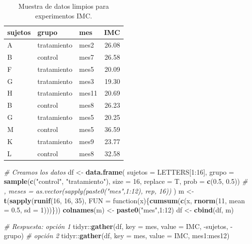 \documentclass[]{article}
\newenvironment{Shaded}{\begin{snugshade}}{\end{snugshade}}
\newcommand{\KeywordTok}[1]{\textcolor[rgb]{0.13,0.29,0.53}{\textbf{{#1}}}}
\newcommand{\DataTypeTok}[1]{\textcolor[rgb]{0.13,0.29,0.53}{{#1}}}
\newcommand{\DecValTok}[1]{\textcolor[rgb]{0.00,0.00,0.81}{{#1}}}
\newcommand{\FloatTok}[1]{\textcolor[rgb]{0.00,0.00,0.81}{{#1}}}
\newcommand{\StringTok}[1]{\textcolor[rgb]{0.31,0.60,0.02}{{#1}}}
\newcommand{\CommentTok}[1]{\textcolor[rgb]{0.56,0.35,0.01}{\textit{{#1}}}}
\newcommand{\NormalTok}[1]{{#1}}
\begin{document}
\begin{table}[H]
\centering
\begin{tabular}{lllr}
  \hline
sujetos & grupo & mes & IMC \\ 
  \hline
A & tratamiento & mes2 & 26.08 \\ 
  B & control & mes7 & 26.58 \\ 
  F & tratamiento & mes5 & 20.09 \\ 
  G & tratamiento & mes3 & 19.30 \\ 
  H & tratamiento & mes11 & 20.69 \\ 
  B & control & mes8 & 26.23 \\ 
  G & tratamiento & mes5 & 20.25 \\ 
  M & control & mes5 & 36.59 \\ 
  K & tratamiento & mes9 & 23.77 \\ 
  L & control & mes8 & 32.58 \\ 
   \hline
\end{tabular}
\caption{Muestra de datos limpios para experimentos IMC.} 
\label{tab:sujetostidy}
\end{table}

\begin{Shaded}
\begin{Highlighting}[]
\CommentTok{# Creamos los datos}
\NormalTok{df <-}\StringTok{ }\KeywordTok{data.frame}\NormalTok{(}
  \DataTypeTok{sujetos =} \NormalTok{LETTERS[}\DecValTok{1}\NormalTok{:}\DecValTok{16}\NormalTok{],}
  \DataTypeTok{grupo =} \KeywordTok{sample}\NormalTok{(}\KeywordTok{c}\NormalTok{(}\StringTok{"control"}\NormalTok{, }\StringTok{"tratamiento"}\NormalTok{), }\DataTypeTok{size =} \DecValTok{16}\NormalTok{, }\DataTypeTok{replace =} \NormalTok{T, }\DataTypeTok{prob =} \KeywordTok{c}\NormalTok{(}\FloatTok{0.5}\NormalTok{, }\FloatTok{0.5}\NormalTok{))}
  \CommentTok{# ,  meses = as.vector(sapply(paste0("mes",1:12), rep, 16))}
  \NormalTok{)}
\NormalTok{m <-}\StringTok{ }\KeywordTok{t}\NormalTok{(}\KeywordTok{sapply}\NormalTok{(}\KeywordTok{runif}\NormalTok{(}\DecValTok{16}\NormalTok{, }\DecValTok{16}\NormalTok{, }\DecValTok{35}\NormalTok{), }\DataTypeTok{FUN =} \NormalTok{function(x)\{}\KeywordTok{cumsum}\NormalTok{(}\KeywordTok{c}\NormalTok{(x, }\KeywordTok{rnorm}\NormalTok{(}\DecValTok{11}\NormalTok{, }\DataTypeTok{mean =} \FloatTok{0.5}\NormalTok{, }\DataTypeTok{sd =} \DecValTok{1}\NormalTok{)))\}))}
\KeywordTok{colnames}\NormalTok{(m) <-}\StringTok{ }\KeywordTok{paste0}\NormalTok{(}\StringTok{"mes"}\NormalTok{,}\DecValTok{1}\NormalTok{:}\DecValTok{12}\NormalTok{)}
\NormalTok{df <-}\StringTok{ }\KeywordTok{cbind}\NormalTok{(df, m)}

\CommentTok{# Respuesta: opción 1}
\NormalTok{tidyr::}\KeywordTok{gather}\NormalTok{(df, }\DataTypeTok{key =} \NormalTok{mes, }\DataTypeTok{value =} \NormalTok{IMC, -sujetos, -grupo)}
\CommentTok{# opción 2}
\NormalTok{tidyr::}\KeywordTok{gather}\NormalTok{(df, }\DataTypeTok{key =} \NormalTok{mes, }\DataTypeTok{value =} \NormalTok{IMC, mes1:mes12)}
\end{Highlighting}
\end{Shaded}
\end{document}
